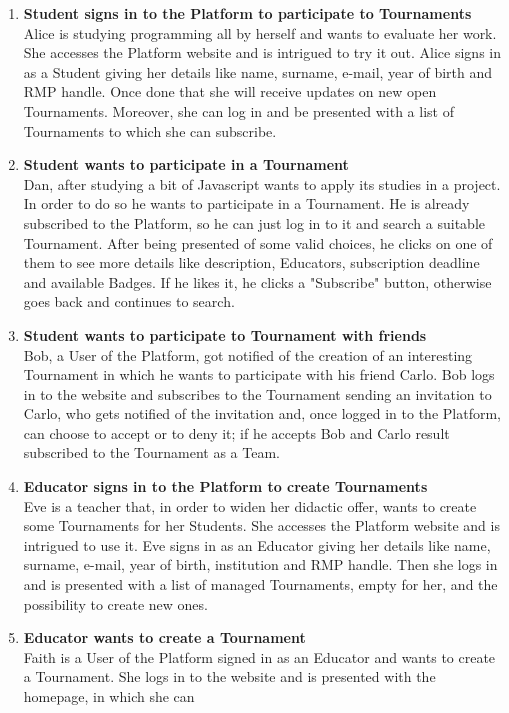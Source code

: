 \begin{enumerate}[label= \textbf{SC\arabic*}]
    \item \textbf{Student signs in to the Platform to participate to Tournaments} \label{sc:sc1}\\ Alice is studying programming all by herself and wants to evaluate her work. She accesses the Platform website and is intrigued to try it out. 
    Alice signs in as a Student giving her details like name, surname, e-mail, year of birth and RMP handle. Once done that she will receive updates on new open Tournaments. Moreover, she can log in and be presented with a list 
    of Tournaments to which she can subscribe.
    \item \textbf{Student wants to participate in a Tournament} \label{sc:sc2}\\ Dan, after studying a bit of Javascript wants to apply its studies in a project. In order to do so he wants to participate in a Tournament. He is already subscribed 
    to the Platform, so he can just log in to it and search a suitable Tournament. After being presented of some valid choices, he clicks on one of them to see more details like description, Educators, subscription deadline and 
    available Badges. If he likes it, he clicks a "Subscribe" button, otherwise goes back and continues to search.
    \item \textbf{Student wants to participate to Tournament with friends} \label{sc:sc3}\\ Bob, a User of the Platform, got notified of the creation of an interesting Tournament in which he wants to participate with his friend Carlo. Bob logs in 
    to the website and subscribes to the Tournament sending an invitation to Carlo, who gets notified of the invitation and, once logged in to the Platform, can choose to accept or to deny it; if he accepts Bob and Carlo result 
    subscribed to the Tournament as a Team.
    \item \textbf{Educator signs in to the Platform to create Tournaments} \label{sc:sc4}\\ Eve is a teacher that, in order to widen her didactic offer, wants to create some Tournaments for her Students. She accesses the Platform website and is 
    intrigued to use it. Eve signs in as an Educator giving her details like name, surname, e-mail, year of birth, institution and RMP handle. Then she logs in and is presented with a list of managed Tournaments, empty for her, 
    and the possibility to create new ones.
    \item \textbf{Educator wants to create a Tournament} \label{sc:sc5}\\ Faith is a User of the Platform signed in as an Educator and wants to create a Tournament. She logs in to the website and is presented with the homepage, in which she can 

\end{enumerate}
